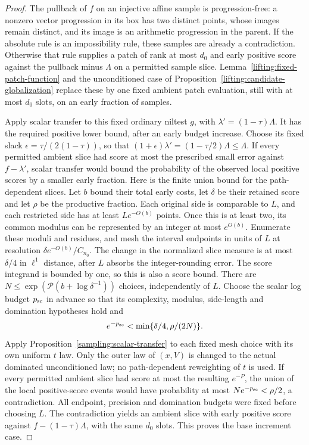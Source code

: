 \begin{proof}
The pullback of $f$ on an injective affine sample is progression-free:
a nonzero vector progression in its box has two distinct points,
whose images remain distinct, and its image is an arithmetic
progression in the parent.  If the absolute rule is an impossibility
rule, these samples are already a contradiction.  Otherwise that
rule supplies a patch of rank at most $d_0$ and early positive score
against the pullback minus $\Lambda$ on a permitted sample slice.
Lemma~\ref{lifting:fixed-patch-function} and the unconditioned case
of Proposition~\ref{lifting:candidate-globalization} replace these
by one fixed ambient patch evaluation, still with at most $d_0$
slots, on an early fraction of samples.

Apply scalar transfer to this fixed ordinary niltest $g$, with
$\lambda'=(1-\tau)\Lambda$.  It has the required positive lower
bound, after an early budget increase.  Choose its fixed slack
$\epsilon=\tau/(2(1-\tau))$, so that
$(1+\epsilon)\lambda'=(1-\tau/2)\Lambda\le\Lambda$.
If every permitted ambient slice had score at most the prescribed
small error against $f-\lambda'$, scalar transfer would bound the
probability of the observed local positive scores by a smaller
early fraction.  Here is the finite union bound for the path-dependent
slices.  Let $b$ bound their total early costs, let $\delta$ be their
retained score and let $\rho$ be the productive fraction.  Each
original side is comparable to $L$, and each restricted side has
at least $Le^{-O(b)}$ points.  Once this is at least two, its common
modulus can be represented by an integer at most $e^{O(b)}$.
Enumerate these moduli and residues, and mesh the interval endpoints
in units of $L$ at resolution $\delta e^{-O(b)}/C_{n_0}$.  The change
in the normalized slice measure is at most $\delta/4$ in $\ell^1$
distance, after $L$ absorbs the integer-rounding error.  The score
integrand is bounded by one, so this is also a score bound.  There
are $N\le\exp(\mathcal P(b+\log\delta^{-1}))$ choices, independently
of $L$.  Choose the scalar log budget $p_{\rm sc}$ in advance so
that its complexity, modulus, side-length and domination hypotheses
hold and
\[
 e^{-p_{\rm sc}}<\min\{\delta/4,\rho/(2N)\}.
\]
Apply Proposition~\ref{sampling:scalar-transfer} to each fixed mesh
choice with its own uniform $t$ law.  Only the outer law of $(x,V)$
is changed to the actual dominated unconditioned law; no
path-dependent reweighting of $t$ is used.  If every permitted
ambient slice had score at most the resulting $e^{-P}$, the union
of the local positive-score events would have probability at most
$Ne^{-p_{\rm sc}}<\rho/2$, a contradiction.  All endpoint,
precision and domination budgets were fixed before choosing $L$.
The contradiction yields an ambient slice with early positive score
against $f-(1-\tau)\Lambda$, with the same $d_0$ slots.  This proves
the base increment case.


\end{proof}
